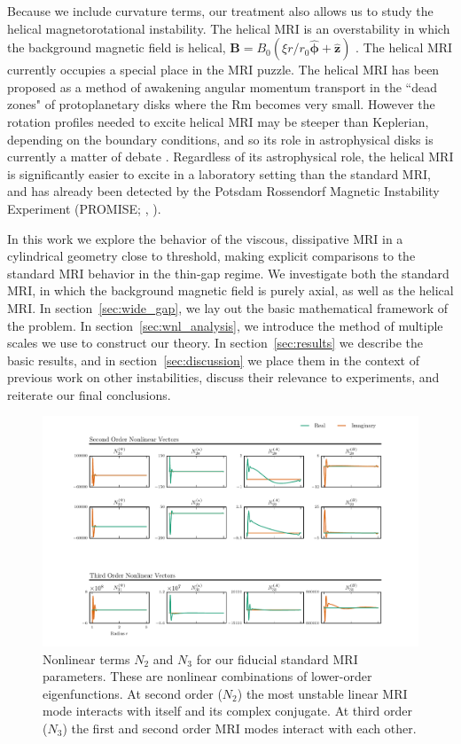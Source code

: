 \documentclass{emulateapj}
\newcommand{\citei}[1]{\citeauthor{#1} \citeyear{#1}}
\newcommand\reym{\mathrm{Rm}}
\begin{document}
Because we include curvature terms, our treatment also allows us to study the helical magnetorotational instability. The helical MRI is an overstability in which the background magnetic field is helical, $\mathbf{B} = B_0 (\xi r/r_0 \mathbf{\hat{\phi}} + \mathbf{\hat{z}})$ \citet{Hollerbach:2005tr}. The helical MRI currently occupies a special place in the MRI puzzle. The helical MRI has been proposed as a method of awakening angular momentum transport in the ``dead zones" of protoplanetary disks where the $\reym$ becomes very small. However the rotation profiles needed to excite helical MRI may be steeper than Keplerian, depending on the boundary conditions, and so its role in astrophysical disks is currently a matter of debate \citep{Liu:2006,Rudiger:2007,Kirillov:2013}. Regardless of its astrophysical role, the helical MRI is significantly easier to excite in a laboratory setting than the standard MRI, and has already been detected by the Potsdam Rossendorf Magnetic Instability Experiment (PROMISE; \citei{Stefani:2006iv}, \citei{Stefani:2009hp}).

In this work we explore the behavior of the viscous, dissipative MRI in a cylindrical geometry close to threshold, making explicit comparisons to the standard MRI behavior in the thin-gap regime. We investigate both the standard MRI, in which the background magnetic field is purely axial, as well as the helical MRI. In section~\ref{sec:wide_gap}, we lay out the basic mathematical framework of the problem. In section~\ref{sec:wnl_analysis}, we introduce the method of multiple scales we use to construct our theory. In section~\ref{sec:results} we describe the basic results, and in section~\ref{sec:discussion} we place them in the context of previous work on other instabilities, discuss their relevance to experiments, and reiterate our final conclusions.

\begin{figure}
\centering
\includegraphics[width=\textwidth]{../figures/widegap_n2_n3_Pm16E-7.pdf}
\caption{Nonlinear terms $N_2$ and $N_3$ for our fiducial standard MRI parameters. These are nonlinear combinations of lower-order eigenfunctions. At second order ($N_2$) the most unstable linear MRI mode interacts with itself and its complex conjugate. At third order ($N_3$) the first and second order MRI modes interact with each other.}\label{fig:N2_N3}
\end{figure}
\end{document}
